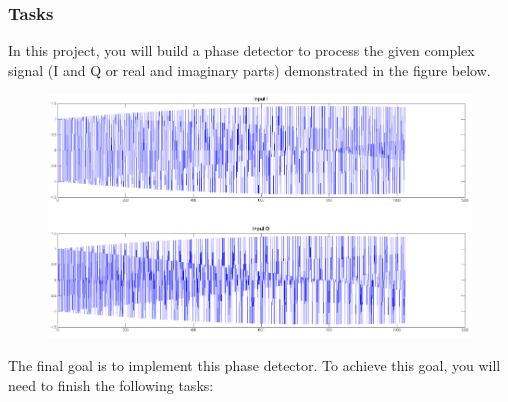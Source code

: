 \documentclass[a4paper,12pt,twoside]{article}
\begin{document}
\subsubsection{Tasks}
In this project, you will build a phase detector to process the given complex signal (I and Q or real and imaginary parts) demonstrated in the figure below.
\begin{figure}[H]
    \centering
    \includegraphics[width=\textwidth]{images/7.png}
\end{figure}
The final goal is to implement this phase detector. To achieve this goal, you will need to finish the following tasks:
\end{document}
